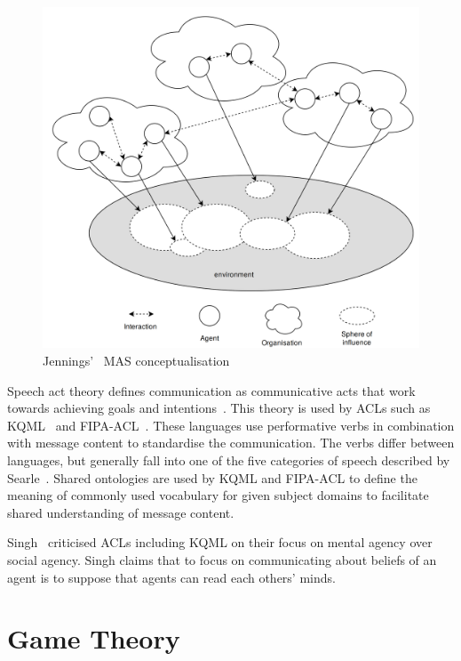 \documentclass[]{final_report}
\begin{document}
\begin{figure}
\vspace{-20pt}
\begin{framed}
\centering
	\includegraphics[width=\textwidth]{JenningsMAS.png}
	\caption{Jennings'~\cite{jennings2000agent} MAS conceptualisation}
	\label{fig:jenningsmas}
\end{framed}
\vspace{-30pt}
\end{figure}
Speech act theory defines communication as communicative acts that work towards achieving goals and intentions~\cite{austin1975things}. This theory is used by ACLs such as KQML~\cite{finin1994kqml} and FIPA-ACL~\cite{o1998fipa}. These languages use performative verbs in combination with message content to standardise the communication. The verbs differ between languages, but generally fall into one of the five categories of speech described by Searle~\cite{searle1969speech}. Shared ontologies are used by KQML and FIPA-ACL to define the meaning of commonly used vocabulary for given subject domains to facilitate shared understanding of message content.\par 
Singh~\cite{singh1998agent} criticised ACLs including KQML on their focus on mental agency over social agency. Singh claims that to focus on communicating about beliefs of an agent is to suppose that agents can read each others' minds.

\section{Game Theory}
\label{sec:backgroundgametheory}
\end{document}
